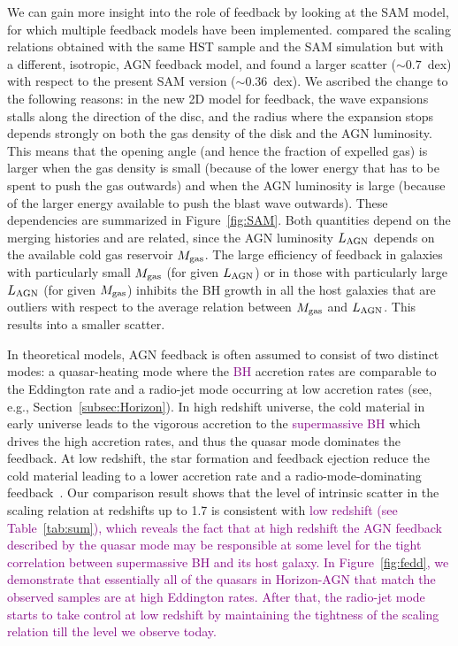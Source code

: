 \documentclass[twocolumn]{aastex631}
\newcommand{\red}[1]{\textcolor{purple}{#1}}
\begin{document}
We can gain more insight into the role of feedback by looking at the SAM model, for which multiple feedback models have been implemented. \citet{Ding2020b} compared the scaling relations obtained with the same HST sample and the SAM simulation but with a different, isotropic, AGN feedback model, and found a larger scatter ($\sim0.7$~dex) with respect to the present SAM version ($\sim0.36$~dex). We ascribed the change to the following reasons: in the new 2D model for feedback, the wave expansions stalls along the direction of the disc, and the radius where the expansion stops depends strongly on both the gas density of the disk and the AGN luminosity. 
This means that the opening angle (and hence the fraction of expelled gas) is larger when the gas density is small (because of the lower energy that has to be spent to push the gas outwards) and when the AGN luminosity is large (because of the larger energy available to push the blast wave outwards). These dependencies are summarized in Figure~\ref{fig:SAM}. 
Both quantities depend on the merging histories and are  related, since the AGN luminosity $L_{\rm AGN}$ depends on the available cold gas reservoir $M_{\rm gas}$.
The large efficiency of feedback in galaxies with particularly small $M_{\rm gas}$ (for given $L_{\rm AGN}$) or in those with particularly large $L_{\rm AGN}$
(for given $M_{\rm gas}$) inhibits the BH growth in all the host galaxies that are outliers with respect to the average relation between $M_{\rm gas}$ and $L_{\rm AGN}$. 
This results into a smaller scatter.

In theoretical models, AGN feedback is often assumed to consist of two distinct modes:
a quasar-heating mode where the \red{BH} accretion rates are comparable to the Eddington rate and a radio-jet mode occurring at low accretion rates (see, e.g., Section~\ref{subsec:Horizon}). In high redshift universe, the cold material in early universe leads to the vigorous accretion to the \red{supermassive BH} which drives the high accretion rates, and thus the quasar mode dominates the feedback. At low redshift, the star formation and feedback ejection reduce the cold material leading to a lower accretion rate and a radio-mode-dominating feedback~\citep[e.g.][]{2012MNRAS.420.2662D,2016MNRAS.460.2979V,2018MNRAS.479.4056W}. Our comparison result shows that the level of intrinsic scatter in the scaling relation at redshifts up to 1.7 is consistent with \red{low redshift (see Table~\ref{tab:sum}), which reveals the fact that at high redshift the AGN feedback described by the quasar mode may be responsible at some level for the tight correlation between supermassive BH and its host galaxy. In Figure~\ref{fig:fedd}, we demonstrate that essentially all of the quasars in Horizon-AGN that match the observed samples are at high Eddington rates. After that, the radio-jet mode starts to take control at low redshift by maintaining the tightness of the scaling relation till the level we observe today. }
\end{document}
